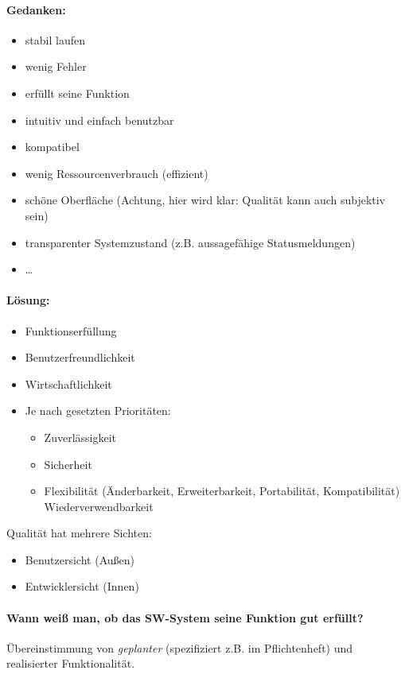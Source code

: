 \documentclass{scrreprt}
\begin{document}
\paragraph{Gedanken:}
\begin{itemize}
\item stabil laufen
\item wenig Fehler
\item erfüllt seine Funktion
\item intuitiv und einfach benutzbar
\item kompatibel
\item wenig Ressourcenverbrauch (effizient)
\item schöne Oberfläche (Achtung, hier wird klar: Qualität kann auch subjektiv sein)
\item transparenter Systemzustand (z.B. aussagefähige Statusmeldungen)
\item …
\end{itemize}
\paragraph{Lösung:}
\begin{itemize}
\item Funktionserfüllung
\item Benutzerfreundlichkeit
\item Wirtschaftlichkeit
\item Je nach gesetzten Prioritäten:
\begin{itemize}
\item Zuverlässigkeit
\item Sicherheit
\item Flexibilität (Änderbarkeit, Erweiterbarkeit, Portabilität, Kompatibilität)
Wiederverwendbarkeit
\end{itemize}
\end{itemize}

Qualität hat mehrere Sichten:
\begin{itemize}
\item Benutzersicht (Außen)
\item Entwicklersicht (Innen)
\end{itemize}
\paragraph{Wann weiß man, ob das SW-System seine Funktion gut erfüllt?}
Übereinstimmung von \emph{geplanter} (spezifiziert z.B. im Pflichtenheft) und realisierter Funktionalität.
\end{document}
